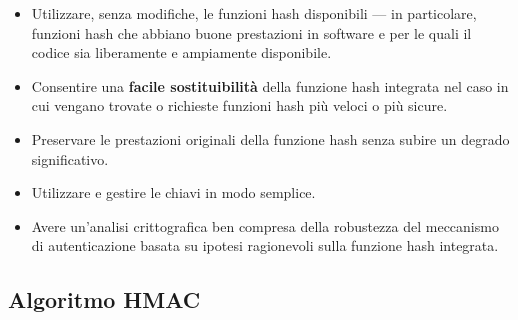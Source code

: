 \documentclass{article}
\begin{document}
\begin{itemize}
    \item Utilizzare, senza modifiche, le funzioni hash disponibili — in particolare, funzioni hash che abbiano buone prestazioni in software e per le quali il codice sia liberamente e ampiamente disponibile.
    \item Consentire una \textbf{facile sostituibilità} della funzione hash integrata nel caso in cui vengano trovate o richieste funzioni hash più veloci o più sicure.
    \item Preservare le prestazioni originali della funzione hash senza subire un degrado significativo.
    \item Utilizzare e gestire le chiavi in modo semplice.
    \item Avere un'analisi crittografica ben compresa della robustezza del meccanismo di autenticazione basata su ipotesi ragionevoli sulla funzione hash integrata.
\end{itemize}

\vspace{0.8cm}

\subsection*{Algoritmo HMAC}
\end{document}
